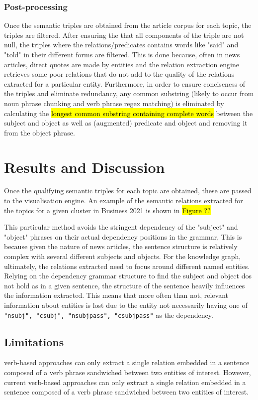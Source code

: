 \subsubsection{Post-processing}
Once the semantic triples are obtained from the article corpus for each topic, the triples are filtered. After ensuring the that all components of the triple are not null, the triples where the relations/predicates contains words like "said" and "told" in their different forms are filtered. This is done because, often in news articles, direct quotes are made by entities and the relation extraction engine retrieves some poor relations that do not add to the quality of the relations extracted for a particular entity. Furthermore, in order to ensure conciseness of the triples and eliminate redundancy, any common substring (likely to occur from noun phrase chunking and verb phrase regex matching) is eliminated by calculating the \hl{longest common substring containing complete words} between the subject and object as well as (augmented) predicate and object and removing it from the object phrase. 


\section{Results and Discussion}

Once the qualifying semantic triples for each topic are obtained, these are passed to the visualisation engine. An example of the semantic relations extracted for the topics for a given cluster in Business 2021 is shown in \hl{Figure ??}


This particular method avoids the stringent dependency of the "subject" and "object" phrases on their actual dependency positions in the grammar, This is because given the nature of news articles, the sentence structure is relatively complex with several different subjects and objects. For the knowledge graph, ultimately, the relations extracted need to focus around different named entities. Relying on the dependency grammar structure to find the subject and object dos not hold as in a given sentence, the structure of the sentence heavily influences the information extracted. This means that more often than not, relevant information about entities is lost due to the entity not necessarily having one of \texttt{"nsubj", "csubj", "nsubjpass",	"csubjpass"} as the dependency. 

\subsection*{Limitations}
verb-based approaches can only extract a
single relation embedded in a sentence composed of a verb
phrase sandwiched between two entities of interest. 
However, current verb-based approaches can only extract a
single relation embedded in a sentence composed of a verb
phrase sandwiched between two entities of interest. 



